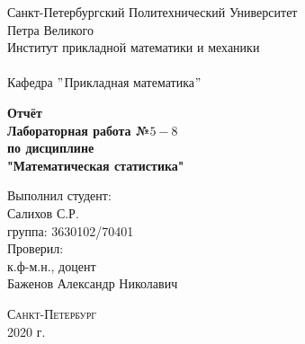 \documentclass[a4]{article}
\begin{document}
	\def\contentsname{\LARGE{Содержание}}
	\thispagestyle{empty}
	\begin{center} 
		\vspace{2cm} 
		{\Large \sc Санкт-Петербургский Политехнический Университет}\\
		\vspace{2mm}
		{\Large\sc Петра Великого}\\
		\vspace{1cm}
		{\large \sc Институт прикладной математики и механики\\ 
			\vspace{0.5mm}
			\textsc{}}\\ 
		\vspace{0.5mm}
		{\large\sc Кафедра $"$Прикладная математика$"$}\\
		\vspace{15mm}
		
		
		{\sc \textbf{Отчёт\\
			Лабораторная работа №$5-8$\\
			по дисциплине\\
			"Математическая статистика"}
			\vspace{6mm}
			
		}
		\vspace*{2mm}
		
		
		\begin{flushleft}
			\vspace{4cm}
			\sc Выполнил студент:\\
			\sc Салихов С.Р.\\
			\sc группа: 3630102/70401\\
			\vspace{1cm}
			\sc Проверил:\\
			\sc к.ф-м.н., доцент\\
			\sc Баженов Александр Николавич
			\vspace{20mm}
		\end{flushleft}
	\end{center} 
	\begin{center}
		\vfill {\large\textsc{Санкт-Петербург}}\\ 
		2020 г.
	\end{center}
	
	\newpage
	\pagestyle{plain}
	
	
	
\end{document}

